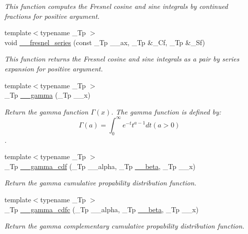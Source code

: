 \begin{DoxyCompactItemize}
\begin{DoxyCompactList}\small\item\em This function computes the Fresnel cosine and sine integrals by continued fractions for positive argument. \end{DoxyCompactList}\item 
{\footnotesize template$<$typename \+\_\+\+Tp $>$ }\\void \hyperlink{namespacestd_1_1____detail_aae7775bc46d621e54fb9d994c2f35e2a}{\+\_\+\+\_\+fresnel\+\_\+series} (const \+\_\+\+Tp \+\_\+\+\_\+ax, \+\_\+\+Tp \&\+\_\+\+Cf, \+\_\+\+Tp \&\+\_\+\+Sf)
\begin{DoxyCompactList}\small\item\em This function returns the Fresnel cosine and sine integrals as a pair by series expansion for positive argument. \end{DoxyCompactList}\item 
{\footnotesize template$<$typename \+\_\+\+Tp $>$ }\\\+\_\+\+Tp \hyperlink{namespacestd_1_1____detail_aa0e76080654c918631595a7da642913f}{\+\_\+\+\_\+gamma} (\+\_\+\+Tp \+\_\+\+\_\+x)
\begin{DoxyCompactList}\small\item\em Return the gamma function $ \Gamma(x) $. The gamma function is defined by\+: \[ \Gamma(a) = \int_0^\infty e^{-t}t^{a-1}dt (a > 0) \]. \end{DoxyCompactList}\item 
{\footnotesize template$<$typename \+\_\+\+Tp $>$ }\\\+\_\+\+Tp \hyperlink{namespacestd_1_1____detail_aa4f1cd082a56f66b7ac2f8d805f66a81}{\+\_\+\+\_\+gamma\+\_\+cdf} (\+\_\+\+Tp \+\_\+\+\_\+alpha, \+\_\+\+Tp \hyperlink{namespacestd_1_1____detail_a090d2f0920e0d208c467609b2a81d717}{\+\_\+\+\_\+beta}, \+\_\+\+Tp \+\_\+\+\_\+x)
\begin{DoxyCompactList}\small\item\em Return the gamma cumulative propability distribution function. \end{DoxyCompactList}\item 
{\footnotesize template$<$typename \+\_\+\+Tp $>$ }\\\+\_\+\+Tp \hyperlink{namespacestd_1_1____detail_a7dc59114c8c223b5570c374a7192d404}{\+\_\+\+\_\+gamma\+\_\+cdfc} (\+\_\+\+Tp \+\_\+\+\_\+alpha, \+\_\+\+Tp \hyperlink{namespacestd_1_1____detail_a090d2f0920e0d208c467609b2a81d717}{\+\_\+\+\_\+beta}, \+\_\+\+Tp \+\_\+\+\_\+x)
\begin{DoxyCompactList}\small\item\em Return the gamma complementary cumulative propability distribution function. \end{DoxyCompactList}\item 

\end{DoxyCompactItemize}
